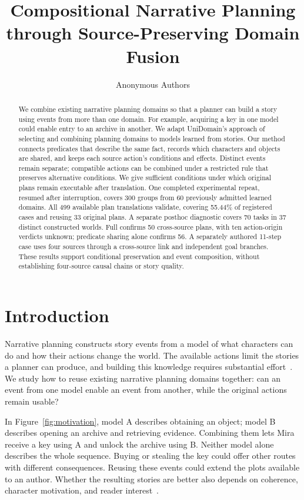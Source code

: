 \documentclass[letterpaper]{article}
\title{Compositional Narrative Planning through Source-Preserving Domain Fusion}
\author{Anonymous Authors}
\begin{document}
\maketitle
\begin{abstract}
We combine existing narrative planning domains so that a planner can build a story using events from more than one domain. For example, acquiring a key in one model could enable entry to an archive in another. We adapt UniDomain's approach of selecting and combining planning domains to models learned from stories. Our method connects predicates that describe the same fact, records which characters and objects are shared, and keeps each source action's conditions and effects. Distinct events remain separate; compatible actions can be combined under a restricted rule that preserves alternative conditions. We give sufficient conditions under which original plans remain executable after translation. One completed experimental repeat, resumed after interruption, covers 300 groups from 60 previously admitted learned domains. All 499 available plan translations validate, covering 55.44\% of registered cases and reusing 33 original plans. A separate posthoc diagnostic covers 70 tasks in 37 distinct constructed worlds. Full confirms 50 cross-source plans, with ten action-origin verdicts unknown; predicate sharing alone confirms 56. A separately authored 11-step case uses four sources through a cross-source link and independent goal branches. These results support conditional preservation and event composition, without establishing four-source causal chains or story quality.
\end{abstract}

\section{Introduction}
Narrative planning constructs story events from a model of what characters can do and how their actions change the world. The available actions limit the stories a planner can produce, and building this knowledge requires substantial effort~\cite{hayton2020acquisition,cheng2025verbnet}. We study how to reuse existing narrative planning domains together: can an event from one model enable an event from another, while the original actions remain usable?

In Figure~\ref{fig:motivation}, model A describes obtaining an object; model B describes opening an archive and retrieving evidence. Combining them lets Mira receive a key using A and unlock the archive using B. Neither model alone describes the whole sequence. Buying or stealing the key could offer other routes with different consequences. Reusing these events could extend the plots available to an author. Whether the resulting stories are better also depends on coherence, character motivation, and reader interest~\cite{rivera2024story}.
\end{document}
